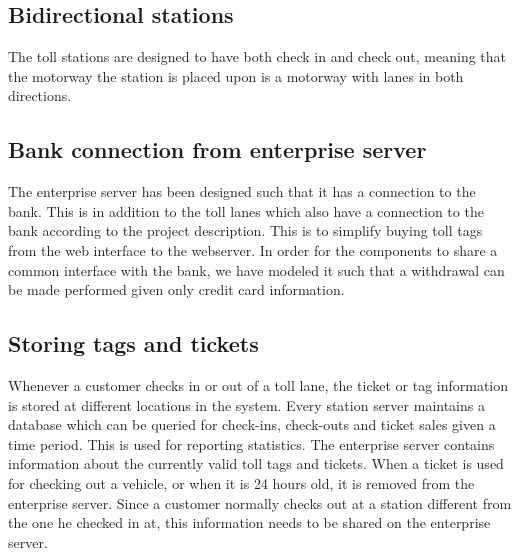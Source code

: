 \subsection{Bidirectional stations}
The toll stations are designed to have both check in and check out, meaning that the motorway the station is placed upon is a motorway with lanes in both directions.

\subsection{Bank connection from enterprise server}
The enterprise server has been designed such that it has a connection to the bank. This is in addition to the toll lanes which also have a connection to the bank according to the project description. This is to simplify buying toll tags from the web interface to the webserver.
In order for the components to share a common interface with the bank, we have modeled it such that a withdrawal can be made performed given only credit card information.

\subsection{Storing tags and tickets}
Whenever a customer checks in or out of a toll lane, the ticket or tag information is stored at different locations in the system. Every station server maintains a database which can be queried for check-ins, check-outs and ticket sales given a time period. This is used for reporting statistics. The enterprise server contains information about the currently valid toll tags and tickets. When a ticket is used for checking out a vehicle, or when it is 24 hours old, it is removed from the enterprise server. Since a customer normally checks out at a station different from the one he checked in at, this information needs to be shared on the enterprise server.